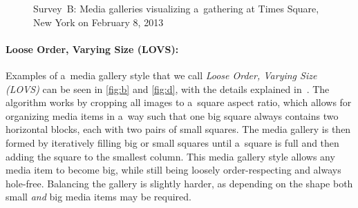 \begin{figure}[!ht]
  \centering
  \caption[Survey~B: Media galleries visualizing a~gathering at Times Square]{Survey~B: Media galleries visualizing a~gathering at Times Square, New York on February 8, 2013}
  \label{fig:media-gallery2}
\end{figure}

\paragraph{Loose Order, Varying Size (LOVS):}

Examples of a~media gallery style
that we call \emph{Loose Order, Varying Size (LOVS)}
can be seen in \autoref{fig:b} and \autoref{fig:d},
with the details explained in~\cite{chedeau2012facebook}.
The algorithm works by cropping all images to a~square aspect ratio,
which allows for organizing media items in a~way such
that one big square always
contains two horizontal blocks, each with two pairs of small squares.
The media gallery is then formed by iteratively filling
big or small squares until a~square is full
and then adding the square to the smallest column.
This media gallery style allows any media item to become big,
while still being loosely order-respecting and always hole-free.
Balancing the gallery is slightly harder,
as depending on the shape both small \emph{and} big
media items may be required.


